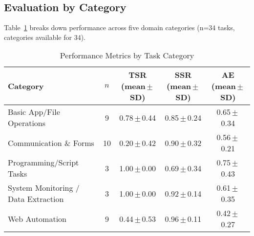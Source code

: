 \documentclass[runningheads]{llncs}
\begin{document}
\subsection{Evaluation by Category}
Table~\ref{tab:by_category} breaks down performance across five domain categories (n=34 tasks, categories available for 34).
\begin{table}[H]
  \centering
  \caption{Performance Metrics by Task Category}
  \label{tab:by_category}
  \begin{tabular}{l c c c c}
    \toprule
    Category                                   & \(n\) 
      & TSR (mean\,\(\pm\)\,SD) 
      & SSR (mean\,\(\pm\)\,SD) 
      & AE (mean\,\(\pm\)\,SD) \\
    \midrule
    Basic App/File Operations                  & 9      
      & 0.78\,\(\pm\)\,0.44 
      & 0.85\,\(\pm\)\,0.24 
      & 0.65\,\(\pm\)\,0.34 \\
    Communication \& Forms                     & 10     
      & 0.20\,\(\pm\)\,0.42 
      & 0.90\,\(\pm\)\,0.32 
      & 0.56\,\(\pm\)\,0.21 \\
    Programming/Script Tasks                   & 3      
      & 1.00\,\(\pm\)\,0.00 
      & 0.69\,\(\pm\)\,0.34 
      & 0.75\,\(\pm\)\,0.43 \\
    System Monitoring / Data Extraction        & 3      
      & 1.00\,\(\pm\)\,0.00 
      & 0.92\,\(\pm\)\,0.14 
      & 0.61\,\(\pm\)\,0.35 \\
    Web Automation                             & 9      
      & 0.44\,\(\pm\)\,0.53 
      & 0.96\,\(\pm\)\,0.11 
      & 0.42\,\(\pm\)\,0.27 \\
    \bottomrule
  \end{tabular}
\end{table}
\end{document}
